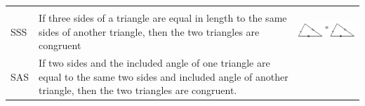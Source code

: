 \begin{center}
\begin{xtabular*}{\mytablewidth}[t]{|p{10\mystarwidth}|p{10\mystarwidth}|p{10\mystarwidth}|}
\begin{center}
    \end{center}    
     \tabularnewline{}
        SSS &
        If three sides of a triangle are equal in length to the same sides of another triangle, then the two triangles are congruent &
    \setcounter{subfigure}{0}
\label{m39368*id318107}
    \begin{center}
    \label{m39368*id318107!!!underscore!!!media}\label{m39368*id318107!!!underscore!!!printimage}\includegraphics[width=.25\columnwidth]{col11306.imgs/m39368_MG10C13_032.png} %
      \vspace{2pt}
    \vspace{.1in}
    \end{center}    
     \tabularnewline{}
        SAS &
        If two sides and the included angle of one triangle are equal to the same two sides and included angle of another triangle, then the two triangles are congruent. &
    \setcounter{subfigure}{0}
\label{m39368*id318143}
    \begin{center}

\end{center}
\end{xtabular*}
\end{center}
